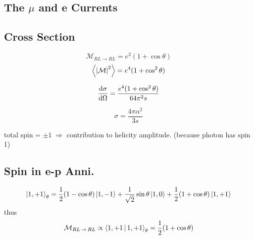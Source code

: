 \documentclass[a4paper]{article}
\DeclareMathOperator{\ra}{\rightarrow}
\DeclareMathOperator{\dra}{\Rightarrow}
\numberwithin{equation}{section}
\begin{document}
\subsection{The $ \mu $ and e Currents}

\subsection{Cross Section}
\begin{equation}\label{key}
\mathcal{M}_{RL\ra RL} = e^2(1 + \cos\theta)
\end{equation}
\begin{equation}\label{key}
\ev{\abs{\mathcal{M}}^2} = e^4 (1 + \cos^2 \theta)
\end{equation}

\begin{equation}\label{key}
\dv{\sigma}{\Omega} = \dfrac{e^4 (1 + \cos^2 \theta)}{64\pi^2 s}
\end{equation}

\begin{equation}\label{key}
\sigma = \dfrac{4\pi\alpha^2}{3s}
\end{equation}

total spin = $ \pm 1 \; \dra$ contribution to helicity amplitude. (because photon has spin 1)\\

\subsection{}

\subsection{Spin in e-p Anni.}
\begin{equation}\label{key}
\ket{1,+1}_\theta = \dfrac{1}{2}(1 - \cos\theta)\ket{1, -1} + \dfrac{1}{\sqrt{2}}\sin\theta\ket{1,0} + \dfrac{1}{2}(1 +  \cos\theta)\ket{1,+1}
\end{equation}
thus
\begin{equation}\label{key}
\mathcal{M}_{RL\ra RL} \propto \Braket{1,+1 | 1,+1}_\theta = \dfrac{1}{2}(1 + \cos\theta)
\end{equation}
\end{document}
